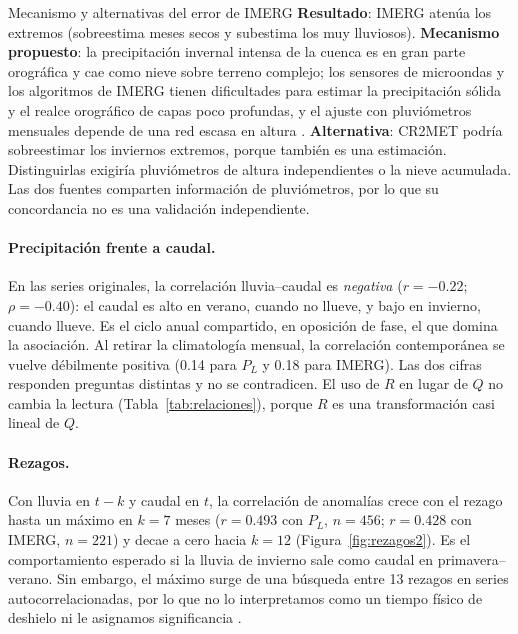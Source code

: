 \documentclass[11pt,a4paper]{article}
\newcommand{\PL}{P_L}
\newcommand{\Qm}{Q}
\begin{document}
\begin{razonamiento}{Mecanismo y alternativas del error de IMERG}
\textbf{Resultado}: IMERG atenúa los extremos (sobreestima meses secos y subestima los muy lluviosos). \textbf{Mecanismo propuesto}: la precipitación invernal intensa de la cuenca es en gran parte orográfica y cae como nieve sobre terreno complejo; los sensores de microondas y los algoritmos de IMERG tienen dificultades para estimar la precipitación sólida y el realce orográfico de capas poco profundas, y el ajuste con pluviómetros mensuales depende de una red escasa en altura \citep{Rojas2021,Tian2018,Zambrano2017}. \textbf{Alternativa}: CR2MET podría sobreestimar los inviernos extremos, porque también es una estimación. Distinguirlas exigiría pluviómetros de altura independientes o la nieve acumulada. Las dos fuentes comparten información de pluviómetros, por lo que su concordancia no es una validación independiente.
\end{razonamiento}

\paragraph{Precipitación frente a caudal.} En las series originales, la correlación lluvia--caudal es \emph{negativa} ($r=-0.22$; $\rho=-0.40$): el caudal es alto en verano, cuando no llueve, y bajo en invierno, cuando llueve. Es el ciclo anual compartido, en oposición de fase, el que domina la asociación. Al retirar la climatología mensual, la correlación contemporánea se vuelve débilmente positiva (0.14 para $\PL$ y 0.18 para IMERG). Las dos cifras responden preguntas distintas y no se contradicen. El uso de $R$ en lugar de $\Qm$ no cambia la lectura (Tabla~\ref{tab:relaciones}), porque $R$ es una transformación casi lineal de $\Qm$.

\paragraph{Rezagos.} Con lluvia en $t-k$ y caudal en $t$, la correlación de anomalías crece con el rezago hasta un máximo en $k=7$ meses ($r=0.493$ con $\PL$, $n=456$; $r=0.428$ con IMERG, $n=221$) y decae a cero hacia $k=12$ (Figura~\ref{fig:rezagos2}). Es el comportamiento esperado si la lluvia de invierno sale como caudal en primavera--verano. Sin embargo, el máximo surge de una búsqueda entre 13 rezagos en series autocorrelacionadas, por lo que no lo interpretamos como un tiempo físico de deshielo ni le asignamos significancia \citep{PyperPeterman1998}.
\end{document}
